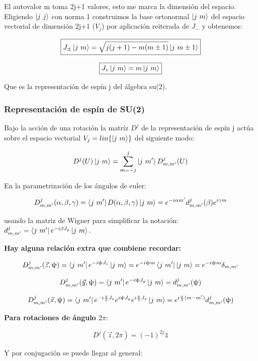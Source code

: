 \documentclass{article}
\begin{document}
        El autovalor m toma 2j+1 valores, esto me marca la dimensión del espacio. Eligiendo $\ket{ j \ j}$ con norma 1 construimos la base ortonormal $\ket{j \ m}$ del espacio vectorial de dimensión 2j+1 ($V_j$) por aplicación reiterada de $J_-$ y obtenemos:

        $$\boxed{J_\pm \ket{j \ m}=\sqrt{j(j+1)-m(m \pm 1)}\ket{ j \ m \pm 1}}$$

        $$\boxed{J_z \ket{j \ m} =m \ket{ j \ m}}$$

        Que es la representación de espín j del álgebra su(2).

        \subsubsection{Representación de espín de SU(2)}

        Bajo la acción de una rotación la matríz $D^j$ de la representación de espín j actúa sobre el espacio vectorial $V_j=lin \lbrace \ket{ j \ m } \rbrace$ del siguiente modo:

        $$D^j(U)\ket{j \ m} = \sum _{m=-j}^j \ket{j \ m '}D^j_{m,m'}(U)$$

        En la parametrización de los ángulos de euler:

        $$D^j_{m,m'}(\alpha , \beta , \gamma)= \bra{j \ m'} D(\alpha , \beta , \gamma ) \ket{j \ m} = e^{-i\alpha m'}d^{j}_{m,m'}(\beta) e^{i\gamma m}$$

        usando la matriz de Wigner para simplificar la notación: $d^j_{m,m'}=\bra{j \ m'} e^{-i\beta J_y} \ket{j \ m}$.

       \textbf{ Hay alguna relación extra que combiene recordar:}

        $$D^j_{m,m'}(\Vec{z},\uppsi)= \bra{j \ m'} e^{-i\uppsi J_z} \ket{j \ m}=e^{-i\uppsi m} \bra{j \ m'} \ket{j \ m}=e^{-i\uppsi m} \delta _{m,m'}$$

        $$D^j_{m,m'}(\Vec{y},  \uppsi
        ) = \bra{j \ m'} e^{-i\uppsi J_y} \ket{j \ m} = d^j_{m,m'}(\uppsi)$$

        $$D^j_{m,m'}(\Vec{x},\uppsi)= \bra{j \ m'} e^{-i\frac{\pi}{2} J_z}e^{i\uppsi J_y} e^{i\frac{\pi}{2}J_z} \ket{j \ m}=e^{i\frac{\pi}{2}(m-m')}d^j_{m,m'}(\uppsi)$$

        \smallskip

        \textbf{Para rotaciones de ángulo $2 \pi$}:

        $$D^j(\Vec{z},2\pi)= (-1)^{2j} \mathds{1}$$

        \smallskip
        Y por conjugación se puede llegar al general:
\end{document}
